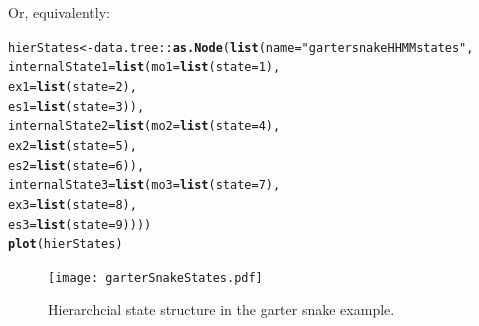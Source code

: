 \documentclass[12pt]{article}\usepackage[]{graphicx}\usepackage[]{xcolor}
\makeatletter
\newcommand{\hlnum}[1]{\textcolor[rgb]{0.686,0.059,0.569}{#1}}%
\newcommand{\hlsng}[1]{\textcolor[rgb]{0.192,0.494,0.8}{#1}}%
\newcommand{\hlopt}[1]{\textcolor[rgb]{0,0,0}{#1}}%
\newcommand{\hldef}[1]{\textcolor[rgb]{0.345,0.345,0.345}{#1}}%
\newcommand{\hlkwb}[1]{\textcolor[rgb]{0.69,0.353,0.396}{#1}}%
\newcommand{\hlkwc}[1]{\textcolor[rgb]{0.333,0.667,0.333}{#1}}%
\newcommand{\hlkwd}[1]{\textcolor[rgb]{0.737,0.353,0.396}{\textbf{#1}}}%
\newenvironment{kframe}{%
 \def\at@end@of@kframe{}%
 \ifinner\ifhmode%
  \def\at@end@of@kframe{\end{minipage}}%
  \begin{minipage}{\columnwidth}%
 \fi\fi%
 \def\FrameCommand##1{\hskip\@totalleftmargin \hskip-\fboxsep
 \colorbox{shadecolor}{##1}\hskip-\fboxsep
     \hskip-\linewidth \hskip-\@totalleftmargin \hskip\columnwidth}%
 \MakeFramed {\advance\hsize-\width
   \@totalleftmargin\z@ \linewidth\hsize
   \@setminipage}}%
 {\par\unskip\endMakeFramed%
 \at@end@of@kframe}
\newenvironment{knitrout}{}{} %
\let\hlstd\hldef
\let\hlstr\hlsng
\makeatother
\begin{document}
\noindent Or, equivalently: 
\begin{knitrout}
\color{fgcolor}\begin{kframe}
\begin{alltt}
\hlstd{hierStates} \hlkwb{<-} \hlstd{data.tree}\hlopt{::}\hlkwd{as.Node}\hlstd{(}\hlkwd{list}\hlstd{(}\hlkwc{name}\hlstd{=}\hlstr{"garter snake HHMM states"}\hlstd{,}
                                      \hlkwc{internalState1}\hlstd{=}\hlkwd{list}\hlstd{(}\hlkwc{mo1}\hlstd{=}\hlkwd{list}\hlstd{(}\hlkwc{state}\hlstd{=}\hlnum{1}\hlstd{),}
                                                          \hlkwc{ex1}\hlstd{=}\hlkwd{list}\hlstd{(}\hlkwc{state}\hlstd{=}\hlnum{2}\hlstd{),}
                                                          \hlkwc{es1}\hlstd{=}\hlkwd{list}\hlstd{(}\hlkwc{state}\hlstd{=}\hlnum{3}\hlstd{)),}
                                      \hlkwc{internalState2}\hlstd{=}\hlkwd{list}\hlstd{(}\hlkwc{mo2}\hlstd{=}\hlkwd{list}\hlstd{(}\hlkwc{state}\hlstd{=}\hlnum{4}\hlstd{),}
                                                          \hlkwc{ex2}\hlstd{=}\hlkwd{list}\hlstd{(}\hlkwc{state}\hlstd{=}\hlnum{5}\hlstd{),}
                                                          \hlkwc{es2}\hlstd{=}\hlkwd{list}\hlstd{(}\hlkwc{state}\hlstd{=}\hlnum{6}\hlstd{)),}
                                      \hlkwc{internalState3}\hlstd{=}\hlkwd{list}\hlstd{(}\hlkwc{mo3}\hlstd{=}\hlkwd{list}\hlstd{(}\hlkwc{state}\hlstd{=}\hlnum{7}\hlstd{),}
                                                          \hlkwc{ex3}\hlstd{=}\hlkwd{list}\hlstd{(}\hlkwc{state}\hlstd{=}\hlnum{8}\hlstd{),}
                                                          \hlkwc{es3}\hlstd{=}\hlkwd{list}\hlstd{(}\hlkwc{state}\hlstd{=}\hlnum{9}\hlstd{))))}
\hlkwd{plot}\hlstd{(hierStates)}
\end{alltt}
\end{kframe}
\end{knitrout}
\begin{figure}[htbp]
  \centering
  \texttt{[image: garterSnakeStates.pdf]}
  \caption{Hierarchcial state structure in the garter snake example.}
  \label{fig:garterSnakeStates}
\end{figure}
\end{document}
